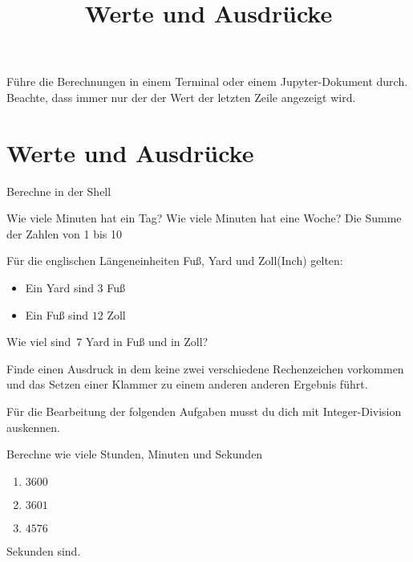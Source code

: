 \documentclass[class=scrartcl, crop=false]{standalone}
\title{Werte und Ausdrücke}
\begin{document}
\noindent
Führe die Berechnungen in einem Terminal oder einem Jupyter-Dokument durch.
Beachte, dass immer nur der der Wert der letzten Zeile angezeigt wird.


\section{Werte und Ausdrücke}
\begin{aufgabe} \noindent 
Berechne in der Shell 
	
\begin{teilaufgaben}
\teilaufgabe Wie viele Minuten hat ein Tag?
\teilaufgabe Wie viele Minuten hat eine Woche?
\teilaufgabe Die Summe der Zahlen von 1 bis 10
\end{teilaufgaben}

\end{aufgabe}



\begin{aufgabe}
\noindent
Für die englischen Längeneinheiten Fuß, Yard und Zoll(Inch) gelten:
\begin{itemize}
	\item Ein Yard sind $3$ Fuß
	\item Ein Fuß sind $12$ Zoll
\end{itemize}
Wie viel sind $\,7$ Yard in Fuß und in Zoll?
\end{aufgabe}

\begin{aufgabe}
\noindent
Finde einen Ausdruck in dem keine zwei verschiedene Rechenzeichen vorkommen und das Setzen einer Klammer zu einem anderen anderen Ergebnis führt.
\end{aufgabe}


Für die Bearbeitung der folgenden Aufgaben musst du dich mit Integer-Division auskennen.

\begin{aufgabe}
Berechne wie viele Stunden,  Minuten und Sekunden \begin{enumerate}
\item $3600$
\item $3601$
\item $4576$ 
\end{enumerate} 

Sekunden sind.
\end{aufgabe}
\end{document}
